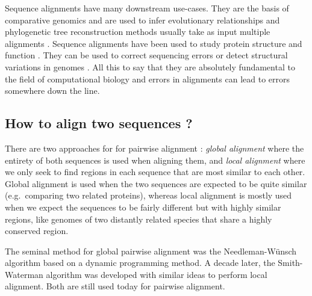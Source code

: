 \documentclass[
  11pt,
  twoside]{scrbook}
\begin{document}
Sequence alignments have many downstream use-cases. They are the basis of comparative genomics \autocite{hardisonComparativeGenomics2003} and are used to infer evolutionary relationships and phylogenetic tree reconstruction methods usually take as input multiple alignments \autocite{felsensteinEvolutionaryTreesDNA1981,kumarMEGAMolecularEvolutionary1994,kozlovRAxMLNGFastScalable2019,guindonNewAlgorithmsMethods2010,priceFastTreeApproximatelyMaximumLikelihood2010}. Sequence alignments have been used to study protein structure \autocites[ ]{jumperHighlyAccurateProtein2021,karplusPredictingProteinStructure1999} and function \autocite{watsonPredictingProteinFunction2005,leePredictingProteinFunction2007}. They can be used to correct sequencing errors \autocite{hacklProovreadLargescaleHighaccuracy2014,korenHybridErrorCorrection2012,salmelaCorrectingErrorsShort2011} or detect structural variations in genomes \autocite{medvedevComputationalMethodsDiscovering2009,mahmoudStructuralVariantCalling2019}. All this to say that they are absolutely fundamental to the field of computational biology and errors in alignments can lead to errors somewhere down the line.

\hypertarget{how-to-align-two-sequences}{%
\subsection{How to align two sequences ?}\label{how-to-align-two-sequences}}

There are two approaches for for pairwise alignment \autocite{sungAlgorithmsBioinformaticsPractical2011}: \emph{global alignment} where the entirety of both sequences is used when aligning them, and \emph{local alignment} where we only seek to find regions in each sequence that are most similar to each other. Global alignment is used when the two sequences are expected to be quite similar (e.g.~comparing two related proteins), whereas local alignment is mostly used when we expect the sequences to be fairly different but with highly similar regions, like genomes of two distantly related species that share a highly conserved region.

The seminal method for global pairwise alignment was the Needleman-Wünsch algorithm \autocite{needlemanGeneralMethodApplicable1970} based on a dynamic programming method. A decade later, the Smith-Waterman algorithm \autocite{smithIdentificationCommonMolecular1981} was developed with similar ideas to perform local alignment. Both are still used today for pairwise alignment.
\end{document}
